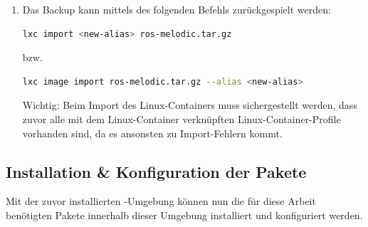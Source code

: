 \begin{enumerate}[label*=\arabic*.]
    \item Das Backup kann mittels des folgenden Befehls zurückgespielt werden:
        \begin{lstlisting}[language=bash]
lxc import <new-alias> ros-melodic.tar.gz
        \end{lstlisting}

        bzw.

        \begin{lstlisting}[language=bash]
lxc image import ros-melodic.tar.gz --alias <new-alias>
        \end{lstlisting}

        \begin{redbox}{Wichtig:}
            Beim Import des Linux-Containers muss sichergestellt werden, dass zuvor alle mit dem Linux-Container verknüpften Linux-Container-Profile vorhanden sind, da es ansonsten zu Import-Fehlern kommt.
        \end{redbox}
\end{enumerate}


\subsection{Installation \& Konfiguration der Pakete}
Mit der zuvor installierten -Umgebung können nun die für diese Arbeit benötigten Pakete innerhalb dieser Umgebung installiert und konfiguriert werden.

